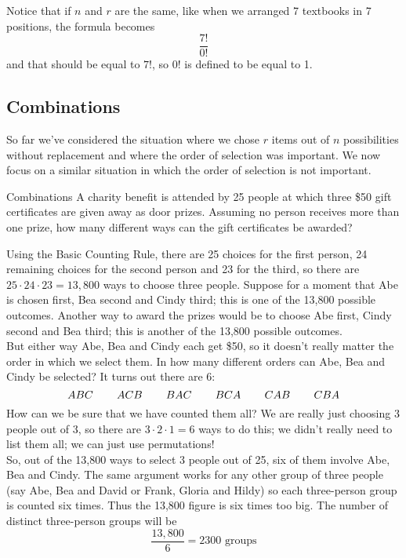 Notice that if $n$ and $r$ are the same, like when we arranged 7 textbooks in 7 positions, the formula becomes \[\dfrac{7!}{0!}\] and that should be equal to $7!$, so $0!$ is defined to be equal to 1.


\subsection{Combinations}
So far we've considered the situation where we chose $r$ items out of $n$ possibilities without replacement and where the order of selection was important. We now focus on a similar situation in which the order of selection is not important.

\begin{example}{Combinations}
A charity benefit is attended by 25 people at which three \$50 gift certificates are given away as door prizes. Assuming no person receives more than one prize, how many different ways can the gift certificates be awarded?

\sol
Using the Basic Counting Rule, there are 25 choices for the first person, 24 remaining choices for the second person and 23 for the third, so there are $25 \cdot 24 \cdot 23 = 13,800$ ways to choose three people. Suppose for a moment that Abe is chosen first, Bea second and Cindy third; this is one of the 13,800 possible outcomes. Another way to award the prizes would be to choose Abe first, Cindy second and Bea third; this is another of the 13,800 possible outcomes.\\

But either way Abe, Bea and Cindy each get \$50, so it doesn't really matter the order in which we select them. In how many different orders can Abe, Bea and Cindy be selected? It turns out there are 6:
\[  ABC \hspace{.3in} ACB \hspace{.3in} BAC \hspace{.3in}  BCA \hspace{.3in} CAB \hspace{.3in}CBA \]
How can we be sure that we have counted them all? We are really just choosing 3 people out of 3, so there are $3 \cdot 2 \cdot 1 = 6$ ways to do this; we didn't really need to list them all; we can just use permutations!\\

So, out of the 13,800 ways to select 3 people out of 25, six of them involve Abe, Bea and Cindy. The same argument works for any other group of three people (say Abe, Bea and David or Frank, Gloria and Hildy) so each three-person group is counted six times. Thus the 13,800 figure is six times too big. The number of distinct three-person groups will be
\[\dfrac{13,800}{6} = \boxed{2300 \textrm{ groups}}\]
\end{example}


